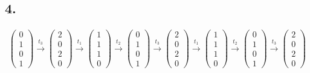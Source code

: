 \documentclass[12pt, paper=a4]{article}
\begin{document}
\subsection*{4.}
\begin{align*}
\begin{pmatrix}
0 \\ 1 \\ 0 \\ 1
\end{pmatrix}
\overset{t_3}{\rightarrow}
\begin{pmatrix}
2 \\ 0 \\ 2 \\ 0
\end{pmatrix}
\overset{t_1}{\rightarrow}
\begin{pmatrix}
1 \\ 1 \\ 1 \\ 0
\end{pmatrix}
\overset{t_2}{\rightarrow}
\begin{pmatrix}
0 \\ 1 \\ 0 \\ 1
\end{pmatrix}
\overset{t_3}{\rightarrow}
\begin{pmatrix}
2 \\ 0 \\ 2 \\ 0
\end{pmatrix}
\overset{t_1}{\rightarrow}
\begin{pmatrix}
1 \\ 1 \\ 1 \\ 0
\end{pmatrix}
\overset{t_2}{\rightarrow}
\begin{pmatrix}
0 \\ 1 \\ 0 \\ 1
\end{pmatrix}
\overset{t_3}{\rightarrow}
\begin{pmatrix}
2 \\ 0 \\ 2 \\ 0
\end{pmatrix}
\end{align*}
\end{document}
